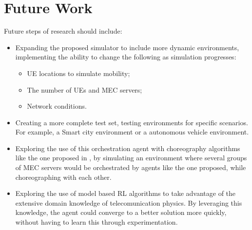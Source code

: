 \section{Future Work}
\noindent Future steps of research should include:
\begin{itemize}
    \item Expanding the proposed simulator to include more dynamic environments, implementing the ability to change the following as simulation progresses:
    \begin{itemize}
      \item \acrshort{UE} locations to simulate mobility;
      \item The number of \acrshort{UE}s and \acrshort{MEC} servers;
      \item Network conditions.
    \end{itemize}
    \item Creating a more complete test set, testing environments for specific scenarios. For example, a Smart city environment or a autonomous vehicle environment. 
    \item Exploring the use of this orchestration agent with choreography algorithms like the one proposed in \cite{Lulu}, by simulating an environment where several groups of \acrshort{MEC} servers would be orchestrated by agents like the one proposed, while choreographing with each other.
    \item Exploring the use of model based \acrshort{RL} algorithms to take advantage of the extensive domain knowledge of telecomunication physics. By leveraging this knowledge, the agent could converge to a better solution more quickly, without having to learn this through experimentation.
\end{itemize}